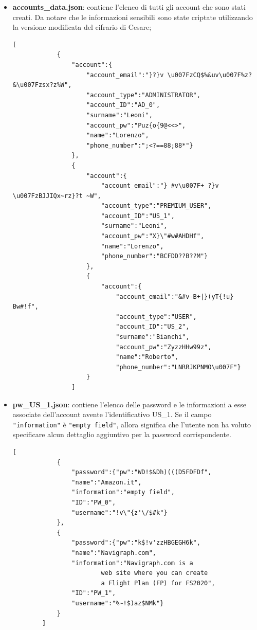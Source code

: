 \documentclass[a4paper, 12pt, one column, aas_macros]{article}
\begin{document}
\begin{itemize}
		\item \textbf{accounts\_data.json}: contiene l'elenco di tutti gli account che sono stati creati. Da notare che le informazioni sensibili sono state criptate utilizzando la versione modificata del cifrario di Cesare;
		\begin{Verbatim}[tabsize=1]
		[
			{
				"account":{
					"account_email":"}?}v \u007FzCQ$%&uv\u007F%z?&\u007Fzsx?z%W",
					"account_type":"ADMINISTRATOR",
					"account_ID":"AD_0",
					"surname":"Leoni",
					"account_pw":"Puz{o{9@<<>",
					"name":"Lorenzo",
					"phone_number":";<?==88;88*"}
				},
				{
					"account":{
						"account_email":"} #v\u007F+ ?}v \u007FzBJJIQx~rz}?t ~W",
						"account_type":"PREMIUM_USER",
						"account_ID":"US_1",
						"surname":"Leoni",
						"account_pw":"X}\"#w#AHDHf",
						"name":"Lorenzo",
						"phone_number":"BCFDD??B??M"}
					},
					{
						"account":{
							"account_email":"&#v-B+|}(yT{!u} Bw#!f",
							"account_type":"USER",
							"account_ID":"US_2",
							"surname":"Bianchi",
							"account_pw":"ZyzzHHw99z",
							"name":"Roberto",
							"phone_number":"LNRRJKPNMO\u007F"}
					}
				]
		\end{Verbatim}
	
		\item \textbf{pw\_US\_1.json}: contiene l'elenco delle password e le informazioni a esse associate dell'account avente l'identificativo US\_1. Se il campo \verb|"information"| è \verb|"empty field"|, allora significa che l'utente non ha voluto specificare alcun dettaglio aggiuntivo per la password corrispondente. 
		\begin{Verbatim}[tabsize=1]
		[
			{
				"password":{"pw":"WD!$&Dh)(((D5FDFDf",
				"name":"Amazon.it",
				"information":"empty field",
				"ID":"PW_0",
				"username":"!v\"{z'\/$#k"}
			},
			{
				"password":{"pw":"k$!v'zzHBGEGH6k",
				"name":"Navigraph.com",
				"information":"Navigraph.com is a 
						web site where you can create 
						a Flight Plan (FP) for FS2020",
				"ID":"PW_1",
				"username":"%~!$)az$NMk"}
			}
		]
		\end{Verbatim}
	\end{itemize}
\end{document}
